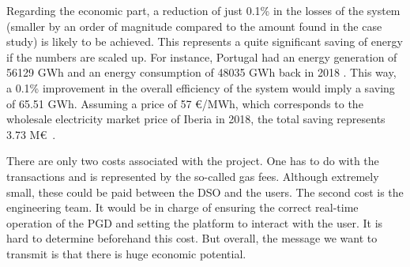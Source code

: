 Regarding the economic part, a reduction of just 0.1\% in the losses of the system (smaller by an order of magnitude compared to the amount found in the case study) is likely to be achieved. This represents a quite significant saving of energy if the numbers are scaled up. For instance, Portugal had an energy generation of 56129 GWh and an energy consumption of 48035 GWh back in 2018 \cite{edpp}. This way, a 0.1\% improvement in the overall efficiency of the system would imply a saving of 65.51 GWh. Assuming a price of 57 \euro/MWh, which corresponds to the wholesale electricity market price of Iberia in 2018, the total saving represents 3.73 M\euro \ \cite{edpr}. 

There are only two costs associated with the project. One has to do with the transactions and is represented by the so-called gas fees. Although extremely small, these could be paid between the DSO and the users. The second cost is the engineering team. It would be in charge of ensuring the correct real-time operation of the PGD and setting the platform to interact with the user. It is hard to determine beforehand this cost. But overall, the message we want to transmit is that there is huge economic potential. 

